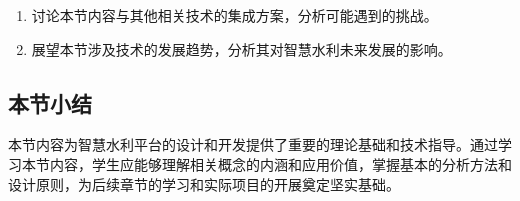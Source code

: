 \begin{enumerate}
\def\labelenumi{\arabic{enumi}.}
\setcounter{enumi}{6}
\tightlist
\item
  讨论本节内容与其他相关技术的集成方案，分析可能遇到的挑战。
\item
  展望本节涉及技术的发展趋势，分析其对智慧水利未来发展的影响。
\end{enumerate}

\subsection{本节小结}\label{ux672cux8282ux5c0fux7ed3-3}

本节内容为智慧水利平台的设计和开发提供了重要的理论基础和技术指导。通过学习本节内容，学生应能够理解相关概念的内涵和应用价值，掌握基本的分析方法和设计原则，为后续章节的学习和实际项目的开展奠定坚实基础。

